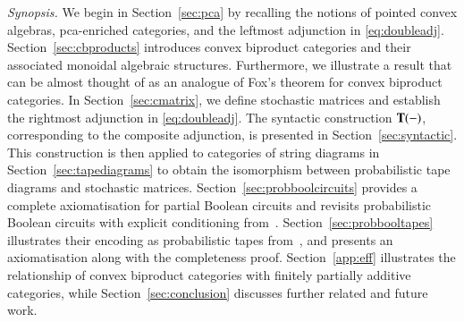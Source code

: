 \medskip






\emph{Synopsis.} We begin in Section~\ref{sec:pca} by recalling the notions of pointed convex algebras, pca-enriched categories, and the leftmost adjunction in \eqref{eq:doubleadj}. Section~\ref{sec:cbproducts} introduces convex biproduct categories and their associated monoidal algebraic structures. Furthermore, we illustrate a result that can be almost thought of as an analogue of Fox's theorem for convex biproduct categories. In Section~\ref{sec:cmatrix}, we define stochastic matrices and establish the rightmost adjunction in \eqref{eq:doubleadj}. The syntactic construction \( \mathbf{T}(-) \), corresponding to the composite adjunction, is presented in Section~\ref{sec:syntactic}. This construction is then applied to categories of string diagrams in Section~\ref{sec:tapediagrams} to obtain the isomorphism between probabilistic tape diagrams and stochastic matrices. Section~\ref{sec:probboolcircuits} provides a complete axiomatisation for partial Boolean circuits and revisits probabilistic Boolean circuits with explicit conditioning from~\cite{piedeleu2025boolean}. Section~\ref{sec:probbooltapes} illustrates their encoding as probabilistic tapes from~\cite{bonchi2025tapediagramsmonoidalmonads}, and presents an axiomatisation along with the completeness proof. Section~\ref{app:eff} illustrates the relationship of convex biproduct categories with finitely partially additive categories, while Section~\ref{sec:conclusion} discusses further related and future work.

